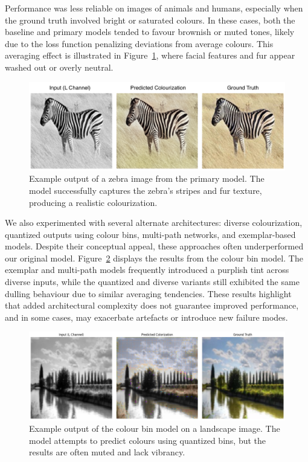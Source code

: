 \documentclass{article} %
\begin{document}
Performance was less reliable on images of animals and humans, especially when the ground truth involved bright or saturated colours. In these cases, both the baseline and primary models 
tended to favour brownish or muted tones, likely due to the loss function penalizing deviations from average colours. This averaging effect is illustrated in Figure~\ref{fig:final-model-zebra},
where facial features and fur appear washed out or overly neutral.

\begin{figure}[htbp]            %
  \centering
  \includegraphics[width=0.9\linewidth]{Figs/final-model-example.png}
  \caption{Example output of a zebra image from the primary model. The model successfully captures the zebra's stripes and fur texture, producing a realistic colourization.}
  \label{fig:final-model-zebra}
\end{figure}

We also experimented with several alternate architectures: diverse colourization, quantized outputs using colour bins, multi-path networks, and exemplar-based models. Despite their 
conceptual appeal, these approaches often underperformed our original model. Figure~\ref{fig:colour-bins-landscape} displays the results from the colour bin model. The exemplar and multi-path models 
frequently introduced a purplish tint across diverse inputs, while the quantized and diverse variants still exhibited the same dulling behaviour due to similar averaging tendencies. 
These results highlight that added architectural complexity does not guarantee improved performance, and in some cases, may exacerbate artefacts or introduce new failure modes.

\begin{figure}[htbp]            %
  \centering
  \includegraphics[width=0.9\linewidth]{Figs/colour-bins-landscape.jpg}
  \caption{Example output of the colour bin model on a landscape image. The model attempts to predict colours using quantized bins, but the results are often muted and lack vibrancy.}
  \label{fig:colour-bins-landscape}
\end{figure}
\end{document}

